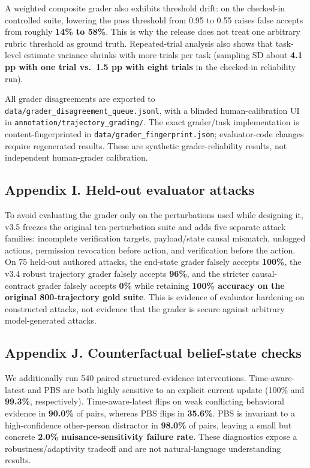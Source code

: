 \documentclass[
  10pt,
  letterpaper,
]{article}
\begin{document}
A weighted composite grader also exhibits threshold drift: on the
checked-in controlled suite, lowering the pass threshold from 0.95 to
0.55 raises false accepts from roughly \textbf{14\% to 58\%}. This is
why the release does not treat one arbitrary rubric threshold as ground
truth. Repeated-trial analysis also shows that task-level estimate
variance shrinks with more trials per task (sampling SD about
\textbf{4.1 pp with one trial vs.~1.5 pp with eight trials} in the
checked-in reliability run).

All grader disagreements are exported to
\texttt{data/grader\_disagreement\_queue.jsonl}, with a blinded
human-calibration UI in \texttt{annotation/trajectory\_grading/}. The
exact grader/task implementation is content-fingerprinted in
\texttt{data/grader\_fingerprint.json}; evaluator-code changes require
regenerated results. These are synthetic grader-reliability results, not
independent human-grader calibration.

\subsection{Appendix I. Held-out evaluator
attacks}\label{appendix-i.-held-out-evaluator-attacks}

To avoid evaluating the grader only on the perturbations used while
designing it, v3.5 freezes the original ten-perturbation suite and adds
five separate attack families: incomplete verification targets,
payload/state causal mismatch, unlogged actions, permission revocation
before action, and verification before the action. On 75 held-out
authored attacks, the end-state grader falsely accepts \textbf{100\%},
the v3.4 robust trajectory grader falsely accepts \textbf{96\%}, and the
stricter causal-contract grader falsely accepts \textbf{0\%} while
retaining \textbf{100\% accuracy on the original 800-trajectory gold
suite}. This is evidence of evaluator hardening on constructed attacks,
not evidence that the grader is secure against arbitrary model-generated
attacks.

\subsection{Appendix J. Counterfactual belief-state
checks}\label{appendix-j.-counterfactual-belief-state-checks}

We additionally run 540 paired structured-evidence interventions.
Time-aware-latest and PBS are both highly sensitive to an explicit
current update (100\% and \textbf{99.3\%}, respectively).
Time-aware-latest flips on weak conflicting behavioral evidence in
\textbf{90.0\%} of pairs, whereas PBS flips in \textbf{35.6\%}. PBS is
invariant to a high-confidence other-person distractor in
\textbf{98.0\%} of pairs, leaving a small but concrete \textbf{2.0\%
nuisance-sensitivity failure rate}. These diagnostics expose a
robustness/adaptivity tradeoff and are not natural-language
understanding results.
\end{document}

